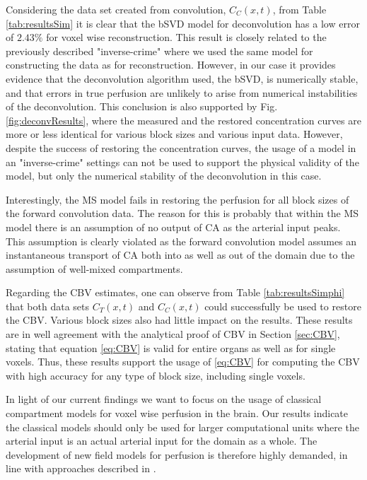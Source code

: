 \documentclass[paper=a4, fontsize=11pt,parskip=half,headings=small]{scrartcl}
\begin{document}
Considering the data set created from convolution, $C_C(x,t)$, from Table \ref{tab:resultsSim} it is clear that the bSVD model for deconvolution has a low error of $2.43 \%$ for voxel wise reconstruction. This result is closely related to the previously described "inverse-crime" where we used the same model for constructing the data as for reconstruction. However, in our case it provides evidence that the deconvolution algorithm used, the bSVD, is numerically stable, and that errors in true perfusion are unlikely to arise from numerical instabilities of the deconvolution. This conclusion is also supported by Fig. \ref{fig:deconvResults}, where the measured and the restored concentration curves are more or less identical for various block sizes and various input data. However, despite the success of restoring the concentration curves, the usage of a model in an "inverse-crime" settings can not be used to support the physical validity of the model, but only the numerical stability of the deconvolution in this case. 

Interestingly, the MS model fails in restoring the perfusion for all block sizes of the forward convolution data. The reason for this is probably that within the MS model there is an assumption of no output of CA as the arterial input peaks. This assumption is clearly violated as the forward convolution model assumes an instantaneous transport of CA both into as well as out of the domain due to the assumption of well-mixed compartments.
	 
Regarding the CBV estimates, one can observe from Table \ref{tab:resultsSimphi} that both data sets $C_T(x,t)$ and $C_C(x,t)$ could successfully be used to restore the CBV. Various block sizes also had little impact on the results. These results are in well agreement with the analytical proof of CBV in Section \ref{sec:CBV}, stating that equation \eqref{eq:CBV} is valid for entire organs as well as for single voxels. Thus, these results support the usage of \eqref{eq:CBV} for computing the CBV with high accuracy for any type of block size, including single voxels.
	 
	 
In light of our current findings we want to focus on the usage of classical compartment models for voxel wise perfusion in the brain. Our results indicate the classical models should only be used for larger computational units where the arterial input is an actual arterial input for the domain as a whole. The development of new field models for perfusion is therefore highly demanded, in line with approaches described in \cite{sourbron14}. 
\end{document}
